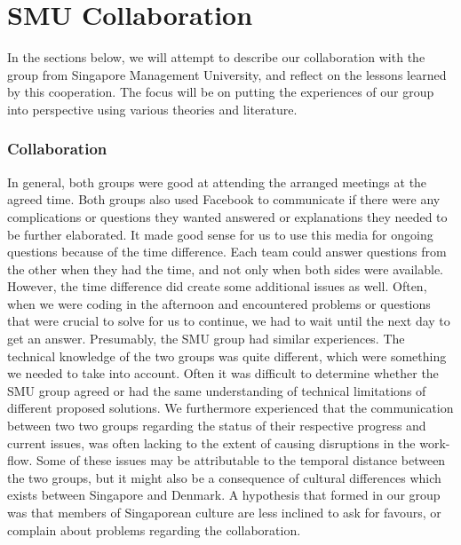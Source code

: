 \part{SMU Collaboration} \label{SmuCollaboration}
In the sections below, we will attempt to describe our collaboration with the group from Singapore Management University, and reflect on the lessons learned by this cooperation. The focus will be on putting the 
experiences of our group into perspective using various theories and literature.

\section{Collaboration}
In general, both groups were good at attending the arranged meetings at the agreed time.
Both groups also used Facebook to communicate if there were any complications or questions they wanted answered or explanations they needed to be further elaborated. It made good sense for us to use this media for ongoing questions because of the time difference. Each team could answer questions from the other when they had the time, and not only when both sides were available. However, the time difference did create some additional issues as well. Often, when we were coding in the afternoon and encountered problems or questions that were crucial to solve for us to continue, we had to wait until the next day to get an answer. Presumably, the SMU group had similar experiences.
The technical knowledge of the two groups was quite different, which were something we needed to take into account. Often it was difficult to determine whether the SMU group agreed or had the same understanding of technical limitations of different proposed solutions. We furthermore experienced that the communication between two two groups regarding the status of their respective progress and current issues, was often lacking to the extent of causing disruptions in the work-flow.  Some of these issues may be attributable to the temporal distance between the two groups, but it might also be a consequence of cultural differences which exists between Singapore and Denmark. A hypothesis that formed in our group was that members of Singaporean culture are less inclined to ask for favours, or complain about problems regarding the collaboration.
 
